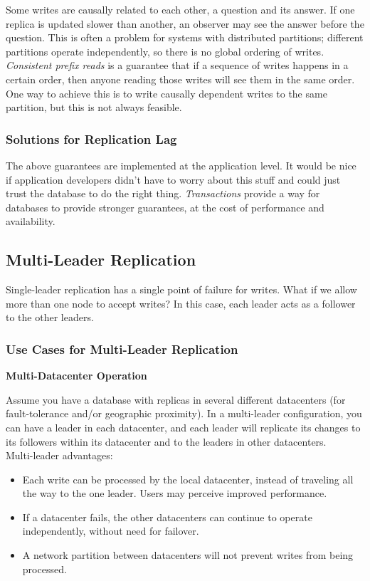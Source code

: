 \documentclass[12pt, titlepage]{article}
\newcommand{\subsubsubsection}[1]{\small \textbf{#1} \medskip}
\begin{document}
Some writes are causally related to each other, a question and its answer. If one replica is updated slower than another, an observer may see the answer before the question. This is often a problem for systems with distributed partitions; different partitions operate independently, so there is no global ordering of writes. \\

\textit{Consistent prefix reads} is a guarantee that if a sequence of writes happens in a certain order, then anyone reading those writes will see them in the same order. One way to achieve this is to write causally dependent writes to the same partition, but this is not always feasible.

\subsubsection{Solutions for Replication Lag}

The above guarantees are implemented at the application level. It would be nice if application developers didn't have to worry about this stuff and could just trust the database to do the right thing. \textit{Transactions} provide a way for databases to provide stronger guarantees, at the cost of performance and availability.

\subsection{Multi-Leader Replication}

Single-leader replication has a single point of failure for writes. What if we allow more than one node to accept writes? In this case, each leader acts as a follower to the other leaders.

\subsubsection{Use Cases for Multi-Leader Replication}

\subsubsubsection{Multi-Datacenter Operation}

Assume you have a database with replicas in several different datacenters (for fault-tolerance and/or geographic proximity). In a multi-leader configuration, you can have a leader in each datacenter, and each leader will replicate its changes to its followers within its datacenter and to the leaders in other datacenters. \\

Multi-leader advantages:
\begin{itemize}
	\item Each write can be processed by the local datacenter, instead of traveling all the way to the one leader. Users may perceive improved performance.
	\item If a datacenter fails, the other datacenters can continue to operate independently, without need for failover.
	\item A network partition between datacenters will not prevent writes from being processed.
\end{itemize}
\end{document}
